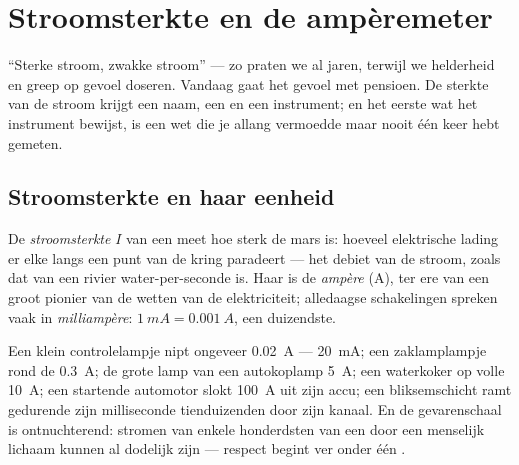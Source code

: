 \chapter{Stroomsterkte en de ampèremeter}\label{ch:g8:intensity-ammeter}

``Sterke stroom, zwakke stroom'' --- zo praten we al jaren, terwijl we
helderheid en greep op gevoel doseren. Vandaag gaat het gevoel met
pensioen. De sterkte van de stroom krijgt een naam, een
 en een instrument; en het eerste wat het instrument
bewijst, is een wet die je allang vermoedde maar nooit één keer hebt
gemeten.

\section{Stroomsterkte en haar eenheid}

\begin{definition}[Stroomsterkte]\label{def:g8:intensity-ammeter:intensity}
De \emph{stroomsterkte} $I$ van een
 meet hoe sterk de mars is: hoeveel
elektrische lading er elke  langs een punt van de kring
paradeert --- het debiet van de stroom, zoals dat van een rivier
water-per-seconde is. Haar  is de
\emph{ampère} (\unit{A}), ter ere van een groot pionier
van de wetten van de elektriciteit; alledaagse schakelingen spreken
vaak in \emph{milliampère}: $\qty{1}{mA} = \qty{0.001}{A}$, een
duizendste.
\end{definition}

\begin{example}\label{ex:g8:intensity-ammeter:values}
Een klein controlelampje nipt ongeveer \qty{0.02}{A} --- \qty{20}{mA};
een zaklamplampje rond de \qty{0.3}{A}; de grote lamp van een
autokoplamp \qty{5}{A}; een waterkoker op volle  \qty{10}{A}; een
startende automotor slokt \qty{100}{A} uit zijn
accu; een bliksemschicht ramt gedurende zijn milliseconde
tienduizenden  door zijn kanaal. En de gevarenschaal is
ontnuchterend: stromen van enkele honderdsten van een
 door een menselijk lichaam kunnen al dodelijk zijn ---
respect begint ver onder één .
\end{example}

